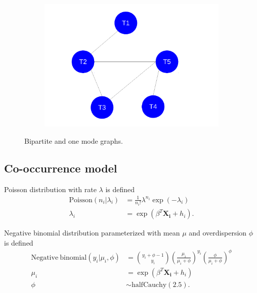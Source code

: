 \documentclass[12pt,letterpaper]{article}
\begin{document}
\begin{figure}[ht]
  \begin{subfigure}[b]{0.4\textwidth}
    \caption{}
    \includegraphics[height = 0.5\textheight, width = \textwidth, keepaspectratio = true]{figure/one_mode}
    \label{subfig:one_mode}
  \end{subfigure}
  \caption{Bipartite and one mode graphs.}
  \label{fig:graphs}
\end{figure}




\subsection{Co-occurrence model}

Poisson distribution with rate \(\lambda\) is defined 
\begin{align}
  \mathrm{Poisson}(n_{i} | \lambda_{i}) &= \frac{1}{n_{i}!} \lambda^{n_{i}} \exp(-\lambda_{i}) 
  \label{eq:pois} \\
  \lambda_{i} &= \exp(\beta^{T}\mathbf{X_{i}} + h_{i}).
  \label{eq:lambda}
\end{align}

Negative binomial distribution parameterized with mean \(\mu\) and overdispersion \(\phi\) is defined
\begin{align}
  \mathrm{Negative\ binomial}(y_{i} | \mu_{i}, \phi) &= {y_{i} + \phi -1 \choose y_{i}} \left(\frac{\mu_{i}}{\mu_{i} + \phi}\right)^{y_{i}} \left(\frac{\phi}{\mu_{i} + \phi}\right)^{\phi}
  \label{eq:neg_bin} \\
  \mu_{i} &= \exp(\beta^{T}\mathbf{X_{i}} + h_{i}) 
  \label{eq:mu} \\
  \phi &\sim \mathrm{halfCauchy}(2.5).
  \label{eq:phi} 
\end{align}
\end{document}
